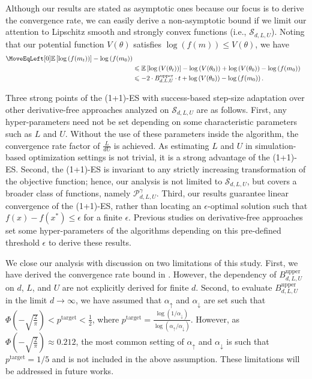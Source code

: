 \documentclass[journal]{IEEEtran}
\providecommand{\E}{\mathbb{E}} %
\renewcommand{\leq}{\leqslant} %
\theoremstyle{definition}
\newcommand{\aup}{\alpha_{\uparrow}}
\newcommand{\adown}{\alpha_{\downarrow}}
\begin{document}
Although our results are stated as asymptotic ones because our focus is to derive the convergence rate, we can easily derive a non-asymptotic bound if we limit our attention to Lipschitz smooth and strongly convex functions (i.e., $\mathcal{S}_{d,L,U}$). Noting that our potential function $V(\theta)$ satisfies $\log(f(m)) \leq V(\theta)$, we have
\begin{equation}
\begin{split}
    \MoveEqLeft[0]\E\left[\log\left( f(m_t) \right)\right] - \log\left(f(m_0)\right)\\
    &\leq \E\left[\log\left( V(\theta_t) \right)\right] - \log\left( V(\theta_0) \right) + \log\left( V(\theta_0) \right) - \log\left( f(m_0) \right)
    \\
    &\leq - 2\cdot B_{d, L, U}^\mathrm{upper} \cdot t +  \log\left( V(\theta_0) \right) - \log\left( f(m_0) \right) .
\end{split}
\end{equation}

Three strong points of the (1+1)-ES with success-based step-size adaptation over other derivative-free approaches analyzed on $\mathcal{S}_{d,L,U}$ are as follows. 
First, any hyper-parameters need not be set depending on some characteristic parameters such as $L$ and $U$.
Without the use of these parameters inside the algorithm, the convergence rate factor of $\frac{L}{d U}$ is achieved. 
As estimating $L$ and $U$ in simulation-based optimization settings is not trivial, it is a strong advantage of the (1+1)-ES.
Second, the (1+1)-ES is invariant to any strictly increasing transformation of the objective function; hence, our analysis is not limited to $\mathcal{S}_{d,L,U}$, but covers a broader class of functions, namely $\mathcal{P}_{d, L, U}^{\gamma}$.%
Third, our results guarantee linear convergence of the (1+1)-ES, rather than locating an $\epsilon$-optimal solution such that $f(x) - f(x^*) \leq \epsilon$ for a finite $\epsilon$. 
Previous studies on derivative-free approaches \cite{2019gradientlesgolovins, nesterov2017random} set some hyper-parameters of the algorithms depending on this pre-defined threshold $\epsilon$ to derive these results. 


We close our analysis with discussion on two limitations of this study. 
First, we have derived the convergence rate bound in .
However, the dependency of $B_{d, L, U}^\mathrm{upper}$ on $d$, $L$, and $U$ are not explicitly derived for finite $d$. 
Second, to evaluate $B_{d, L, U}^\mathrm{upper}$ in the limit $d \to \infty$, we have assumed that $\aup$ and $\adown$ are set such that $\Phi\left(-\sqrt{\frac{2}{\pi}}\right) < p^\mathrm{target} < \frac{1}{2}$, where $p^\mathrm{target} = \frac{\log(1/\adown)}{\log(\aup / \adown)}$. 
However, as $\Phi\left(-\sqrt{\frac{2}{\pi}}\right)\approx 0.212$, the most common setting of $\aup$ and $\adown$ is such that $p^\mathrm{target} = 1/5$ \cite{rechenberg1973evolution} and is not included in the above assumption.
These limitations will be addressed in future works.
\end{document}
